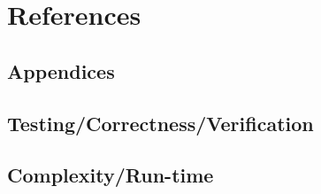 \documentclass[11pt]{article}
\newcommand{\maincontent}{
\clearpage
\phantom{}
}
\begin{document}
\par{}\par

\subsection{}
\par{}\par

\par{}\par


\maincontent
\section{References}
\subsection{}
\url{}
\par {} 


\maincontent
\begin{center}
\section{Appendices}
\br
\subsection{Testing/Correctness/Verification}
\subsection{Complexity/Run-time}
\end{center}
\end{document}

